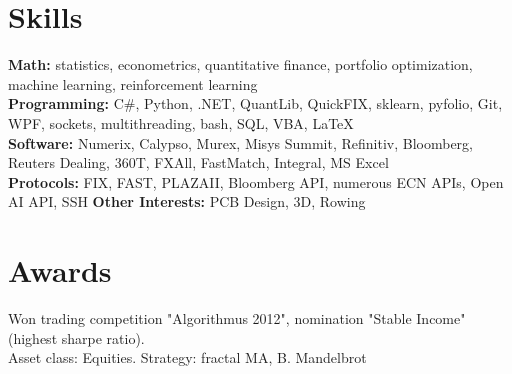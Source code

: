 \documentclass[letterpaper,hidelinks]{article}
\newcommand{\resumeSubHeadingListStart}{\begin{itemize}[leftmargin=0.1in, label={}]}
\newcommand{\resumeSubHeadingListEnd}{\end{itemize}}
\begin{document}
\vspace{-11pt}
\section{Skills}
\resumeSubHeadingListStart
\small{\item{
              \textbf{{Math:}}{ statistics, econometrics, quantitative finance, portfolio optimization, machine learning, reinforcement learning\\} %
              \textbf{{Programming:}}{ C\#, Python, .NET, QuantLib, QuickFIX, sklearn, pyfolio, Git, WPF, sockets, multithreading, bash, SQL, VBA, \LaTeX\\} %
              \textbf{{Software:}}{ Numerix, Calypso, Murex, Misys Summit, Refinitiv, Bloomberg, Reuters Dealing, 360T, FXAll, FastMatch, Integral, MS Excel\\} %
              \textbf{{Protocols:}}{ FIX, FAST, PLAZAII, Bloomberg API, numerous ECN APIs, Open AI API, SSH } %
              \textbf{{Other Interests:}}{ PCB Design, 3D, Rowing} %
        }}

\resumeSubHeadingListEnd
\vspace{-12pt}
\section{Awards}
\begin{description}%
  \item{Won trading competition "Algorithmus 2012", nomination "Stable Income" (highest sharpe ratio). \\Asset class: Equities. Strategy: fractal MA, B. Mandelbrot}  
\vspace{-3pt}
\end{description}
\end{document}
